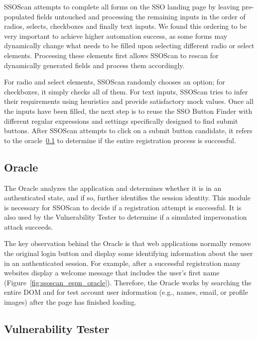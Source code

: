SSOScan attempts to complete all forms on the SSO landing page by leaving pre-populated fields untouched and processing the remaining inputs in the order of radios, selects, checkboxes and finally text inputs.  We found this ordering to be very important to achieve higher automation success, as some forms may dynamically change what needs to be filled upon selecting different radio or select elements.  Processing these elements first allows SSOScan to rescan for dynamically generated fields and process them accordingly.  

For radio and select elements, SSOScan randomly chooses an option; for checkboxes, it simply checks all of them.  For text inputs, SSOScan tries to infer their requirements using heuristics and provide satisfactory mock values.  Once all the inputs have been filled, the next step is to reuse the SSO Button Finder with different regular expressions and settings specifically designed to find submit buttons.  After SSOScan attempts to click on a submit button candidate, it refers to the oracle~\ref{sec:ssoscan_design_oracle} to determine if the entire registration process is successful.

\subsection{Oracle}
\label{sec:ssoscan_design_oracle}

The Oracle analyzes the application and determines whether it is in an authenticated state, and if so, further identifies the session identity.  This module is necessary for SSOScan to decide if a registration attempt is successful.  It is also used by the Vulnerability Tester to determine if a simulated impersonation attack succeeds.

The key observation behind the Oracle is that web applications normally remove the original login button and display some identifying information about the user in an authenticated session.  For example, after a successful registration many websites display a welcome message that includes the user's first name (Figure~\ref{fig:ssoscan_espn_oracle}).  Therefore, the Oracle works by searching the entire DOM and  for test account user information (e.g., names, email, or profile images) after the page has finished loading.

\subsection{Vulnerability Tester}
\label{sec:ssoscan_design_vt}

